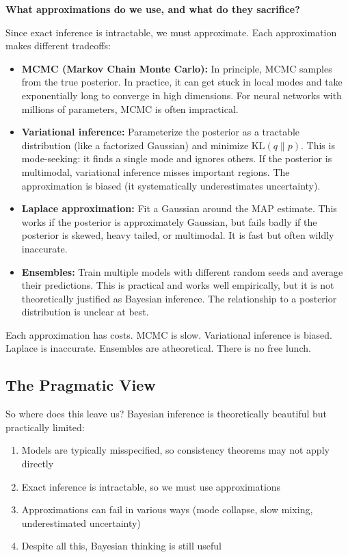 \vspace{1.5em}

\textbf{What approximations do we use, and what do they sacrifice?}

Since exact inference is intractable, we must approximate. Each approximation makes different tradeoffs:

\begin{itemize}
\item \textbf{MCMC (Markov Chain Monte Carlo):} In principle, MCMC samples from the true posterior. In practice, it can get stuck in local modes and take exponentially long to converge in high dimensions. For neural networks with millions of parameters, MCMC is often impractical.

\item \textbf{Variational inference:} Parameterize the posterior as a tractable distribution (like a factorized Gaussian) and minimize $\text{KL}(q \| p)$. This is mode-seeking: it finds a single mode and ignores others. If the posterior is multimodal, variational inference misses important regions. The approximation is biased (it systematically underestimates uncertainty).

\item \textbf{Laplace approximation:} Fit a Gaussian around the MAP estimate. This works if the posterior is approximately Gaussian, but fails badly if the posterior is skewed, heavy tailed, or multimodal. It is fast but often wildly inaccurate.

\item \textbf{Ensembles:} Train multiple models with different random seeds and average their predictions. This is practical and works well empirically, but it is not theoretically justified as Bayesian inference. The relationship to a posterior distribution is unclear at best.
\end{itemize}

Each approximation has costs. MCMC is slow. Variational inference is biased. Laplace is inaccurate. Ensembles are atheoretical. There is no free lunch.

\subsection{The Pragmatic View}

So where does this leave us? Bayesian inference is theoretically beautiful but practically limited:

\begin{enumerate}
\item Models are typically misspecified, so consistency theorems may not apply directly
\item Exact inference is intractable, so we must use approximations
\item Approximations can fail in various ways (mode collapse, slow mixing, underestimated uncertainty)
\item Despite all this, Bayesian thinking is still useful
\end{enumerate}

